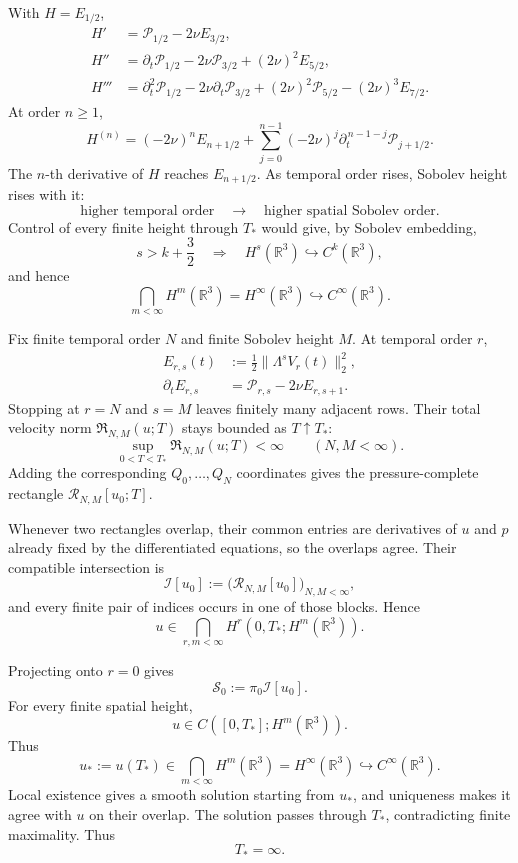 \documentclass[12pt]{article}
\newcommand{\R}{\mathbb R}
\newcommand{\I}{\mathcal I}
\newcommand{\cR}{\mathcal R}
\newcommand{\Szero}{\mathscr S_0}
\begin{document}
With \(H=E_{1/2}\),
\[
\begin{aligned}
  H'
  &=
  \mathcal P_{1/2}-2\nu E_{3/2},
  \\
  H''
  &=
  \partial_t\mathcal P_{1/2}
  -2\nu\mathcal P_{3/2}
  +(2\nu)^2E_{5/2},
  \\
  H'''
  &=
  \partial_t^2\mathcal P_{1/2}
  -2\nu\partial_t\mathcal P_{3/2}
  +(2\nu)^2\mathcal P_{5/2}
  -(2\nu)^3E_{7/2}.
\end{aligned}
\]
At order \(n\geq1\),
\[
  H^{(n)}
  =
  (-2\nu)^nE_{n+1/2}
  +
  \sum_{j=0}^{n-1}
  (-2\nu)^j
  \partial_t^{\,n-1-j}\mathcal P_{j+1/2}.
\]
The \(n\)-th derivative of \(H\) reaches \(E_{n+1/2}\). As temporal order
rises, Sobolev height rises with it:
\[
  \text{higher temporal order}
  \quad\longrightarrow\quad
  \text{higher spatial Sobolev order}.
\]
Control of every finite height through \(T_*\) would give, by Sobolev
embedding,
\[
  s>k+\frac32
  \quad\Longrightarrow\quad
  H^s(\R^3)
  \hookrightarrow
  C^k(\R^3),
\]
and hence
\[
  \bigcap_{m<\infty}H^m(\R^3)
  =
  H^\infty(\R^3)
  \hookrightarrow
  C^\infty(\R^3).
\]

Fix finite temporal order \(N\) and finite Sobolev height \(M\). At temporal
order \(r\),
\[
\begin{aligned}
  E_{r,s}(t)
  &:=
  \frac12\|\Lambda^sV_r(t)\|_2^2,
  \\
  \partial_tE_{r,s}
  &=
  \mathcal P_{r,s}
  -
  2\nu E_{r,s+1}.
\end{aligned}
\]
Stopping at \(r=N\) and \(s=M\) leaves finitely many adjacent rows. Their total
velocity norm \(\mathfrak R_{N,M}(u;T)\) stays bounded as \(T\uparrow T_*\):
\[
  \sup_{0<T<T_*}
  \mathfrak R_{N,M}(u;T)
  <
  \infty
  \qquad (N,M<\infty).
\]
Adding the corresponding \(Q_0,\ldots,Q_N\) coordinates gives the
pressure-complete rectangle \(\cR_{N,M}[u_0;T]\).

Whenever two rectangles overlap, their common entries are derivatives of \(u\)
and \(p\) already fixed by the differentiated equations, so the overlaps
agree. Their compatible intersection is
\[
  \I[u_0]
  :=
  \bigl(\cR_{N,M}[u_0]\bigr)_{N,M<\infty},
\]
and every finite pair of indices occurs in one of those blocks. Hence
\[
  u
  \in
  \bigcap_{r,m<\infty}
  H^r(0,T_*;H^m(\R^3)).
\]

Projecting onto \(r=0\) gives
\[
  \Szero
  :=
  \pi_0\I[u_0].
\]
For every finite spatial height,
\[
  u\in C([0,T_*];H^m(\R^3)).
\]
Thus
\[
  u_*:=u(T_*)
  \in
  \bigcap_{m<\infty}H^m(\R^3)
  =
  H^\infty(\R^3)
  \hookrightarrow
  C^\infty(\R^3).
\]
Local existence gives a smooth solution starting from \(u_*\), and uniqueness
makes it agree with \(u\) on their overlap. The solution passes through
\(T_*\), contradicting finite maximality. Thus
\[
  T_*=\infty.
\]
\end{document}
